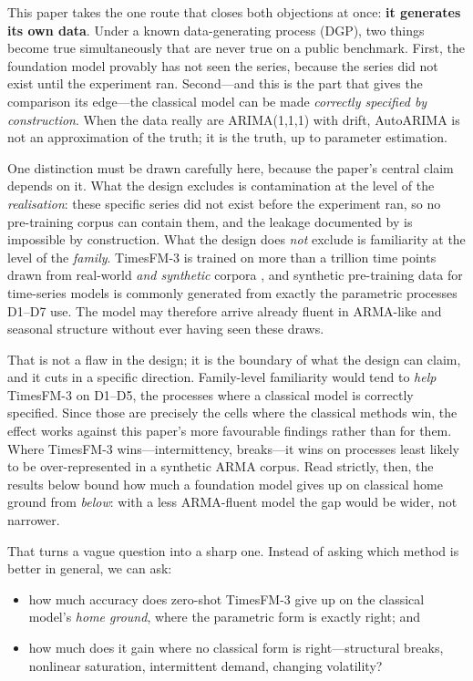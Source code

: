 \documentclass[article]{ajs}
\begin{document}
This paper takes the one route that closes both objections at once: \textbf{it generates its
own data}. Under a known data-generating process (DGP), two things become true simultaneously
that are never true on a public benchmark. First, the foundation model provably has not seen
the series, because the series did not exist until the experiment ran. Second---and this is
the part that gives the comparison its edge---the classical model can be made
\emph{correctly specified by construction}. When the data really are ARIMA(1,1,1) with drift,
AutoARIMA is not an approximation of the truth; it is the truth, up to parameter estimation.

One distinction must be drawn carefully here, because the paper's central claim depends on it.
What the design excludes is contamination at the level of the \emph{realisation}: these specific
series did not exist before the experiment ran, so no pre-training corpus can contain them, and
the leakage documented by \citet{meyer2025leakage} is impossible by construction. What the design
does \emph{not} exclude is familiarity at the level of the \emph{family}. TimesFM-3 is trained on
more than a trillion time points drawn from real-world \emph{and synthetic} corpora
\citep{timesfm3blog}, and synthetic pre-training data for time-series models is commonly
generated from exactly the parametric processes D1--D7 use. The model may therefore arrive
already fluent in ARMA-like and seasonal structure without ever having seen these draws.

That is not a flaw in the design; it is the boundary of what the design can claim, and it cuts
in a specific direction. Family-level familiarity would tend to \emph{help} TimesFM-3 on D1--D5,
the processes where a classical model is correctly specified. Since those are precisely the
cells where the classical methods win, the effect works against this paper's more favourable
findings rather than for them. Where TimesFM-3 wins---intermittency, breaks---it wins on
processes least likely to be over-represented in a synthetic ARMA corpus. Read strictly, then,
the results below bound how much a foundation model gives up on classical home ground from
\emph{below}: with a less ARMA-fluent model the gap would be wider, not narrower.

That turns a vague question into a sharp one. Instead of asking which method is better in
general, we can ask:

\begin{itemize}
\item how much accuracy does zero-shot TimesFM-3 give up on the classical model's
      \emph{home ground}, where the parametric form is exactly right; and
\item how much does it gain where no classical form is right---structural breaks,
      nonlinear saturation, intermittent demand, changing volatility?
\end{itemize}
\end{document}
